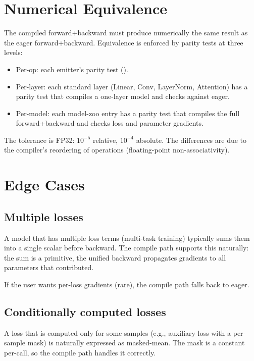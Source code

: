 \section{Numerical Equivalence}
\label{sec:fwd_bwd_compile:numerical_equiv}

The compiled forward+backward must produce numerically the same
result as the eager forward+backward. Equivalence is enforced by
parity tests at three levels:

\begin{itemize}
  \item Per-op: each emitter's parity test
    ().
  \item Per-layer: each standard layer (Linear, Conv,
    LayerNorm, Attention) has a parity test that compiles a
    one-layer model and checks against eager.
  \item Per-model: each model-zoo entry has a parity test that
    compiles the full forward+backward and checks loss and
    parameter gradients.
\end{itemize}

The tolerance is FP32: $10^{-5}$ relative, $10^{-4}$ absolute.
The differences are due to the compiler's reordering of
operations (floating-point non-associativity).

\section{Edge Cases}
\label{sec:fwd_bwd_compile:edge_cases}

\subsection{Multiple losses}
\label{ssec:fwd_bwd_compile:multi_loss}

A model that has multiple loss terms (multi-task training)
typically sums them into a single scalar before backward. The
compile path supports this naturally: the sum is a primitive,
the unified backward propagates gradients to all parameters that
contributed.

If the user wants per-loss gradients (rare), the compile path
falls back to eager.

\subsection{Conditionally computed losses}
\label{ssec:fwd_bwd_compile:conditional_loss}

A loss that is computed only for some samples (e.g., auxiliary
loss with a per-sample mask) is naturally expressed as
masked-mean. The mask is a constant per-call, so the compile
path handles it correctly.

